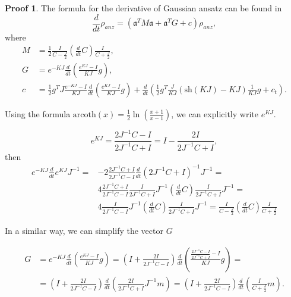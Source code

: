 \documentclass[12pt]{article}
\theoremstyle{definition}
\newtheorem*{demo}{Proof}
\newcommand{\mf}[1]{\mathfrak{#1}}
\begin{document}
	\begin{demo}
		The formula for the derivative of Gaussian ansatz can be found in \cite{Dis}
		\begin{equation}
			\frac{d}{dt}\rho_{anz} = (\mf{a}^TM\mf{a} + \mf{a}^TG + c)\rho_{anz},
		\end{equation}
		where
		\begin{align*}
			M &= \frac{1}{2}\frac{I}{C - \frac{J}{2}}\left(\frac{d}{dt}C\right)\frac{I}{C + \frac{J}{2}},\\
			G &= e^{-KJ}\frac{d}{dt}\left(\frac{e^{KJ} - I}{KJ}g\right),\\
			c &= \frac{1}{2}g^TJ\frac{e^{-KJ} - I}{KJ}\frac{d}{dt}\left( \frac{e^{KJ} - I}{KJ}g  \right) + \frac{d}{dt}\left(  \frac{1}{2}g^T\frac{J}{KJ}(\text{sh}(KJ) - KJ)\frac{1}{KJ}g  +c_t \right).
		\end{align*}
		
		
		Using the formula $\text{arcoth}(x) = \frac{1}{2}\ln\left(\frac{x + 1}{x - 1}\right)$, we can explicitly write $e^{KJ}$.
		
		\begin{equation*}
			e^{KJ} = \frac{2J^{-1}C - I}{2J^{-1}C + I} = I - \frac{2I}{2J^{-1}C + I},
		\end{equation*}
		then
		\begin{align*}
			e^{-KJ}\frac{d}{dt}e^{KJ}J^{-1} =& -2\frac{2J^{-1}C + I}{2J^{-1}C - I}\frac{d}{dt}(2J^{-1}C + I)^{-1}J^{-1} = \\
			&4 \frac{2J^{-1}C + I}{2J^{-1}C - I} \frac{I}{2J^{-1}C + I}J^{-1}\left(\frac{d}{dt}C\right)\frac{I}{2J^{-1}C + I}J^{-1} = \\
			& 4 \frac{I}{2J^{-1}C - I}J^{-1}\left(\frac{d}{dt}C\right)\frac{I}{2J^{-1}C + I}J^{-1} = \frac{I}{C - \frac{J}{2}}\left(\frac{d}{dt}C\right)\frac{I}{C + \frac{J}{2}}
		\end{align*}
		
		In a similar way, we can simplify the vector $G$
		
		\begin{align*}
			G &= e^{-KJ}\frac{d}{dt}\left(\frac{e^{KJ} - I}{KJ}g\right) = \left(  I + \frac{2I}{2J^{-1}C - I}  \right)\frac{d}{dt}\left( \frac{
				\frac{2J^{-1}C - I}{2J^{-1}C + I} - I}{KJ}   g  \right) =\nonumber\\
			& = \left(  I + \frac{2I}{2J^{-1}C - I}  \right)\frac{d}{dt}\left( \frac{2I}{2J^{-1}C + I} J^{-1}m  \right) = \left(  I + \frac{2I}{2J^{-1}C - I}  \right)\frac{d}{dt}\left(\frac{I}{C + \frac{J}{2}}m\right).
		\end{align*}
		

\end{demo}
\end{document}
